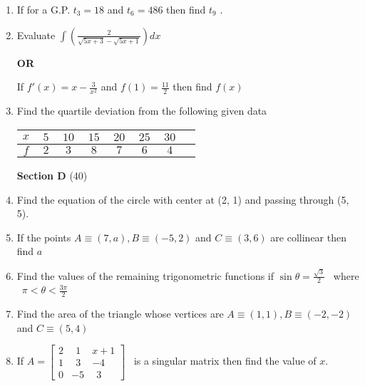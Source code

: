 \documentclass[16pt,a4paper]{article}
\begin{document}
\begin {enumerate}
Prove that $\frac {\sin \theta }{1 + \cos \theta} = \tan \left( \frac {\theta }{2} \right) $

\item If for a G.P. $t_3 = 18$ and $t_6 = 486$ then find $t_9$ .

\item Evaluate $\int  \left(\frac{2}{\sqrt{5x+3} - \sqrt{5x+1} } \right) dx $

\begin{center}
\textbf {OR}
\end{center}

If $ f'(x) = x - \frac {3}{x^2}$ and $ f(1) = \frac {11}{2} $ then find $f(x)$

\item Find the quartile deviation from the following given data  \\

\begin{tabular}{|c|*{7}{c|}}
\hline
$x \ $ & $5\ $ & $10\ $ & $15\ $ & $20\ $ & $25\ $ & $30\ $ \\
\hline
$f \ $ & $2\ $ & $3\ $ & $8\ $ & $7\ $ & $6\ $ & $4\ $ \\
\hline
 \end{tabular} 
 

\begin{center}
\hfill \textbf{Section D} \tabto{16.9cm}(40)
\end{center}

\item Find the equation of the circle with center at (2, 1) and passing through (5, 5). 

\item If the points $ A\equiv (7, a), B \equiv (-5, 2)$ and $ C \equiv (3, 6) $ are collinear then find $ a $

\item Find the values of the remaining trigonometric functions if $ \sin \theta = \frac {\sqrt 3}{2}$ \ where \ $\pi < \theta < \frac{3\pi}{2} $

\item Find the area of the triangle whose vertices are $ A\equiv (1,1), B \equiv (-2,-2)$ and $ C \equiv (5,4)$

\item If \( A = \left[ 
\begin{array}{ccc} 
2&\ \ 1&x+1 \\ 1&\ \ 3&-4 \\ 0&-5&\ \ 3
\end{array} 
\right] \) \ is a singular matrix then find the value of $x$.


\end{enumerate}
\end{document}

